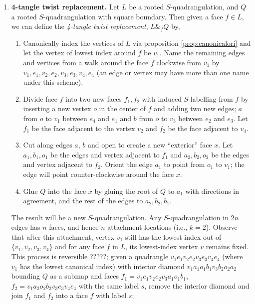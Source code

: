 \documentclass[amsmath,longbibliography,secnumarabic,floatfix,amssymb,nofootinbib,nobibnotes,letterpaper,11pt,notitlepage,tightenlines]{revtex4-1}
\newcommand{\FourTang}{\&}
\begin{document}
\begin{enumerate}
\item \textbf{4-tangle twist replacement.} Let $L$ be a rooted
  $S$-quadrangulation, and $Q$ a rooted $S$-quadrangulation with
  square boundary. Then given a face $f \in L$, we can define the
  \emph{4-tangle twist replacement}, $L \FourTang_f Q$ by,

  \begin{enumerate}
  \item Canonically index the vertices of $L$ via proposition
    \ref{prop:canonicalori} and let the vertex of lowest index around
    $f$ be $v_1$. Name the remaining edges and vertices from a walk
    around the face $f$ clockwise from $v_1$ by $v_1, e_1, v_2, e_2,
    v_3, e_3, v_4, e_4$ (an edge or vertex may have more than one
    name under this scheme).
  \item Divide face $f$ into two new faces $f_1, f_2$ with induced
    $S$-labelling from $f$ by inserting a new vertex $o$ in the center
    of $f$ and adding two new edges; $a$ from $o$ to $v_1$
    between $e_4$ and $e_1$ and $b$ from $o$ to $v_3$ between
    $e_2$ and $e_3$. Let $f_1$ be the face adjacent to the vertex
    $v_2$ and $f_2$ be the face adjacent to $v_4$.
  \item Cut along edges $a$, $b$ and open to create a new ``exterior''
    face $x$. Let $a_1, b_1, o_1$ be the edges and vertex adjacent to
    $f_1$ and $a_2, b_2, o_2$ be the edges and vertex adjacent to
    $f_2$. Orient the edge $a_1$ to point from $o_1$ to $v_1$; the
    edge will point counter-clockwise around the face $x$.
  \item Glue $Q$ into the face $x$ by gluing the root of $Q$ to $a_1$
    with directions in agreement, and the rest of the edges to $a_2,
    b_2, b_1$.
  \end{enumerate}
  The result will be a new $S$-quadrangulation. Any
  $S$-quadrangulation in $2n$ edges has $n$ faces, and hence $n$
  attachment locations (i.e., $k = 2$). Observe that after this
  attachment, vertex $v_1$ still has the lowest index out of $\{v_1,
  v_2, v_3, v_4\}$ and for any face $f$ in $L$, its lowest-index
  vertex $v$ remains fixed. This process is reversible ?????;
  given a quadrangle $v_1e_1v_2e_2v_3e_3v_4e_4$ (where $v_1$ has the
  lowest canonical index) with interior diamond
  $v_1a_1o_1b_1v_3b_2o_2a_2$ bounding $Q$ as a submap and faces $f_1 =
  v_1e_1v_2e_2v_3a_1o_1b_1$, $f_2 = v_1a_2o_2b_2v_3e_3v_4e_4$ with the
  same label $s$, remove the interior diamond and join $f_1$ and $f_2$
  into a face $f$ with label $s$;
\end{enumerate}
\end{document}

